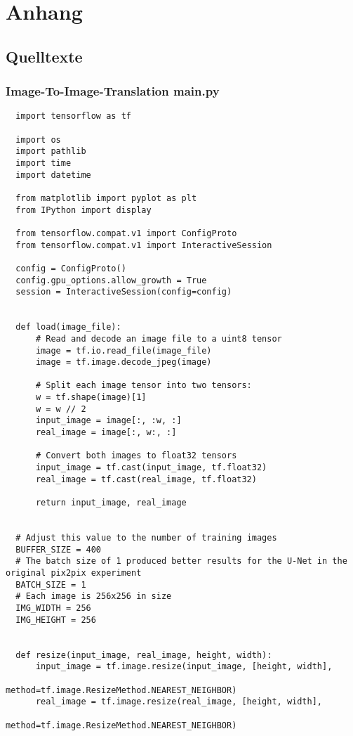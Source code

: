\part*{Anhang}

\chapter{Quelltexte}
\label{ch:a_sim}

\section{Image-To-Image-Translation main.py}
\begin{lstlisting}
  import tensorflow as tf

  import os
  import pathlib
  import time
  import datetime

  from matplotlib import pyplot as plt
  from IPython import display

  from tensorflow.compat.v1 import ConfigProto
  from tensorflow.compat.v1 import InteractiveSession

  config = ConfigProto()
  config.gpu_options.allow_growth = True
  session = InteractiveSession(config=config)


  def load(image_file):
      # Read and decode an image file to a uint8 tensor
      image = tf.io.read_file(image_file)
      image = tf.image.decode_jpeg(image)

      # Split each image tensor into two tensors:
      w = tf.shape(image)[1]
      w = w // 2
      input_image = image[:, :w, :]
      real_image = image[:, w:, :]

      # Convert both images to float32 tensors
      input_image = tf.cast(input_image, tf.float32)
      real_image = tf.cast(real_image, tf.float32)

      return input_image, real_image


  # Adjust this value to the number of training images
  BUFFER_SIZE = 400
  # The batch size of 1 produced better results for the U-Net in the original pix2pix experiment
  BATCH_SIZE = 1
  # Each image is 256x256 in size
  IMG_WIDTH = 256
  IMG_HEIGHT = 256


  def resize(input_image, real_image, height, width):
      input_image = tf.image.resize(input_image, [height, width],
                                    method=tf.image.ResizeMethod.NEAREST_NEIGHBOR)
      real_image = tf.image.resize(real_image, [height, width],
                                   method=tf.image.ResizeMethod.NEAREST_NEIGHBOR)


\end{lstlisting}
